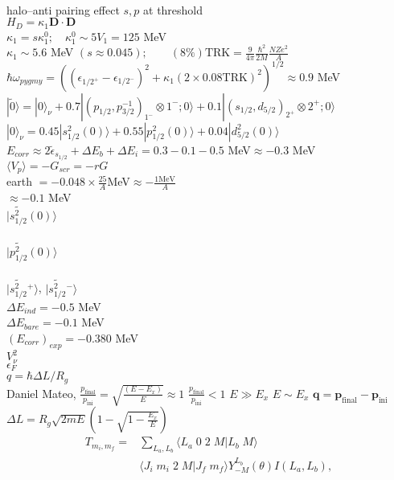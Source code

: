 \documentclass[a4paper,12pt]{book}
\numberwithin{equation}{section}
\numberwithin{figure}{section}
\numberwithin{table}{section}
\begin{document}
\\
halo--anti pairing effect $s,p$ at threshold\\
$H_D=\kappa_1\mathbf D\cdot\mathbf D$\\
$\kappa_1=s\kappa_1^0;\quad\kappa_1^0\sim5V_1=125$ MeV\\
$\kappa_1\sim 5.6$ MeV $(s\approx0.045);\quad \quad (8\%)\text{TRK}=\frac{9}{4\pi}\frac{\hbar^2}{2M}\frac{NZe^2}{A}$\\
$\hbar\omega_{pygmy}=\left((\epsilon_{1/2^+}-\epsilon_{1/2^-})^2+\kappa_1(2\times0.08\text{TRK})^2\right)^{1/2}\approx0.9$ MeV\\
$|\tilde 0\rangle=|0\rangle_\nu+0.7|(p_{1/2},p^{-1}_{3/2})_{1^-}\otimes1^-;0\rangle+0.1|(s_{1/2},d_{5/2})_{2^+}\otimes2^+;0\rangle$\\
$|0\rangle_\nu=0.45|s_{1/2}^2(0)\rangle+0.55|p_{1/2}^2(0)\rangle+0.04|d_{5/2}^2(0)\rangle$\\
$E_{corr}\approx2\tilde\epsilon_{s_{1/2}}+\Delta E_b+\Delta E_i=0.3-0.1-0.5$ MeV$\approx-0.3$ MeV\\
$\langle V_p\rangle=-G_{scr}=-rG$\\earth
$=-0.048\times\frac{25}{A}$MeV$\approx-\frac{1\text{MeV}}{A}$\\
$\approx-0.1$ MeV\\
$|\widetilde {s^2_{1/2}}(0)\rangle$\\
\\
$|\widetilde {p^2_{1/2}}(0)\rangle$\\
\\

$|\widetilde {s^2_{1/2}}{}^+\rangle$, $|\widetilde {s^2_{1/2}}{}^-	\rangle$\\
$\Delta E_{ind}=-0.5$ MeV\\
$\Delta E_{bare}=-0.1$ MeV\\
$(E_{corr})_{exp}=-0.380$ MeV\\
$V_\nu^2$\\
$\epsilon_F$\\
$q=\hbar\Delta L/R_g$\\Daniel Mateo,
$\frac{p_{\text{final}}}{p_{\text{ini}}}=\sqrt{\frac{(E-E_x)}{E}}\approx 1$
$\frac{p_{\text{final}}}{p_{\text{ini}}}< 1$
$E\gg E_x$
$E\sim E_x$
$\mathbf q=\mathbf p_{\text{final}}-\mathbf p_{\text{ini}}$\\
$\Delta L=R_g\sqrt{2m E}\left(1-\sqrt{1-\frac{E_x}{E}}\right)$
\begin{align}
  T_{m_i,m_f}=&\sum_{L_a,L_b}\langle L_a\;0\;2\;M|L_b\;M\rangle\\
  &\langle J_i\;m_i\;2\;M|J_f\;m_f\rangle Y^{L_b}_{-M} (\theta) I(L_a,L_b),
\end{align}
\end{document}
